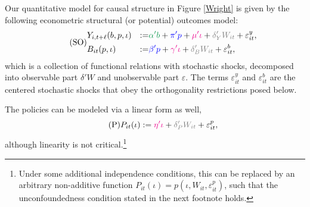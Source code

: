 \documentclass[3p, longtitle]{elsarticle}
\theoremstyle{definition}
\def\bcolor{\color{ForestGreen}}
\def\pcolor{\color{blue}}
\def\icolor{\color{magenta}}
\def\wcolor{\color{gray}}
\begin{document}
Our quantitative model for causal structure in Figure \ref{Wright} is given by the following econometric structural
 (or potential) outcomes model:\begin{equation} \label{eqn:SEM1} \tag{SO}
  \begin{aligned}
   &  Y_{i,t+\ell} (b,p,\iota) &:=& {\bcolor \alpha ' b}  +  {\pcolor \pi 'p} +
    {\icolor \mu'\iota } + {\wcolor \delta_Y 'W_{it}} + \varepsilon^y_{it}, \\
   &  B_{it} (p,\iota) &:= & {\pcolor \beta'p } + {\icolor \gamma'\iota} +      {\wcolor\delta_B 'W_{it} } + \varepsilon^b_{it},
      \end{aligned}
 \end{equation}
which is a collection of functional relations with stochastic shocks, decomposed into observable part $\delta' W$ and unobservable part $\varepsilon$.
The terms $\varepsilon^y_{it}$ and  $\varepsilon^b_{it} $  are the centered stochastic shocks that obey the orthogonality restrictions posed below.


The policies can be modeled via a linear form as well,
\begin{equation}\label{eq:Policy} \tag{P}
 P_{it}   (\iota) :=  {\icolor\eta'\iota} + {\wcolor \delta_P' W_{it}} +   \varepsilon^p_{it},   \end{equation}
although  linearity is not critical.\footnote{Under some additional independence conditions, this
can be replaced by an arbitrary non-additive function $P_{it}(\iota) = p (\iota, W_{it},  \varepsilon^p_{it})$, such that the unconfoundedness condition stated in the next footnote holds.}
\end{document}

